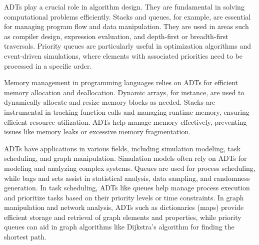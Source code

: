 ADTs play a crucial role in algorithm design. They are fundamental in solving computational problems efficiently. Stacks and queues, for example, are essential for managing program flow and data manipulation.
They are used in areas such as compiler design, expression evaluation, and depth-first or breadth-first traversals. Priority queues are particularly useful in optimization algorithms and event-driven simulations, where
elements with associated priorities need to be processed in a specific order.

Memory management in programming languages relies on ADTs for efficient memory allocation and deallocation. Dynamic arrays, for instance, are used to dynamically allocate and resize memory blocks as needed.
Stacks are instrumental in tracking function calls and managing runtime memory, ensuring efficient resource utilization. ADTs help manage memory effectively, preventing issues like memory leaks or excessive memory 
fragmentation.

ADTs have applications in various fields, including simulation modeling, task scheduling, and graph manipulation. Simulation models often rely on ADTs for modeling and analyzing complex systems. Queues are used
for process scheduling, while bags and sets assist in statistical analysis, data sampling, and randomness generation. In task scheduling, ADTs like queues help manage process execution and prioritize tasks based on their
priority levels or time constraints. In graph manipulation and network analysis, ADTs such as dictionaries (maps) provide efficient storage and retrieval of graph elements and properties, while priority queues can aid in
graph algorithms like Dijkstra's algorithm for finding the shortest path.
